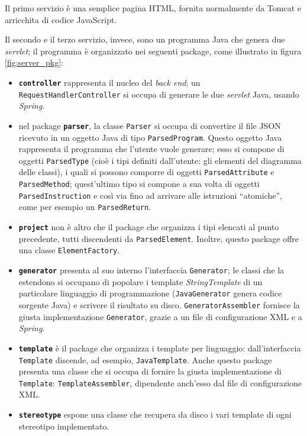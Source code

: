 Il primo servizio è una semplice pagina HTML, fornita normalmente da Tomcat e arricchita di codice JavaScript.

Il secondo e il terzo servizio, invece, sono un programma Java che genera due \emph{servlet}; il programma è organizzato nei seguenti package, come illustrato in figura \ref{fig:server_pkg}:
\begin{itemize}
	\item \textbf{\texttt{controller}} rappresenta il nucleo del \emph{back end}; un \texttt{RequestHandlerController} si occupa di generare le due \emph{servlet} Java, usando \emph{Spring}.
	\item nel package \textbf{\texttt{parser}}, la classe \texttt{Parser} si occupa di convertire il file JSON ricevuto in un oggetto Java di tipo \texttt{ParsedProgram}. Questo oggetto Java rappresenta il programma che l'utente vuole generare; esso si compone di oggetti \texttt{ParsedType} (cioè i tipi definiti dall'utente: gli elementi del diagramma delle classi), i quali si possono comporre di oggetti \texttt{ParsedAttribute} e \texttt{ParsedMethod}; quest'ultimo tipo si compone a sua volta di oggetti \texttt{ParsedInstruction} e così via fino ad arrivare alle istruzioni “atomiche”, come per esempio un \texttt{ParsedReturn}.
	\item \textbf{\texttt{project}} non è altro che il package che organizza i tipi elencati al punto precedente, tutti discendenti da \texttt{ParsedElement}. Inoltre, questo package offre una classe \texttt{ElementFactory}. %
	\item \textbf{\texttt{generator}} presenta al suo interno l'interfaccia \texttt{Generator}; le classi che la estendono si occupano di popolare i template \emph{StringTemplate} di un particolare linguaggio di programmazione (\texttt{JavaGenerator} genera codice sorgente Java) e scrivere il risultato su disco. \texttt{GeneratorAssembler} fornisce la giusta implementazione \texttt{Generator}, grazie a un file di configurazione XML e a \emph{Spring}.
	\item \textbf{\texttt{template}} è il package che organizza i template per linguaggio: dall'interfaccia \texttt{Template} discende, ad esempio, \texttt{JavaTemplate}. Anche questo package presenta una classe che si occupa di fornire la giusta implementazione di \texttt{Template}: \texttt{TemplateAssembler}, dipendente anch'esso dal file di configurazione XML.
	\item \textbf{\texttt{stereotype}} espone una classe che recupera da disco i vari template di ogni stereotipo implementato.

\end{itemize}
